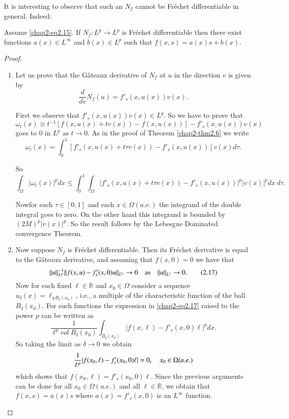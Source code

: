 It is interesting to observe that such an $N_{f}$ cannot be Fr\'echet
differentiable in general. Indeed:

\begin{theorem}\label{chap2-thm2.7}
Assume \eqref{chap2-eq2.15}. If $N_{f}:L^{p}\to L^{p}$ is Fr\'echet
differentiable then there exist functions $a(x)\in L^{\infty}$ and
$b(x)\in L^{p}$ such that $f(x,s)=a(x)s+b(x)$.
\end{theorem}

\begin{proof}
\begin{enumerate}
\renewcommand{\theenumi}{\alph{enumi}}
\renewcommand{\labelenumi}{(\theenumi)}
\item Let us prove that the G\^ateaux derivative of $N_{f}$ at $u$ in
  the direction $v$ is given by
$$
\frac{d}{dv}N_{f}(u)=f'_{s}(x,u(x))v(x).
$$

First we observe that $f'_{s}(x,u(x))v(x)\in L^{q}$. So we have to
prove that
$$
\omega_{t}(x)\equiv
t^{-1}[f(x,u(x)+tv(x))-f(x,u(x))]-f'_{s}(x,u(x))v(x)
$$
goes to $0$ in $L^{p}$ as $t\to 0$. As in the proof of Theorem
\ref{chap2-thm2.6} we write
$$
\omega_{t}(x)=\int^{1}_{0}[f'_{s}(x,u(x)+t\tau
  v(x))-f'_{s}(x,u(x))]v(x)d\tau. 
$$

So
{\fontsize{10pt}{12pt}\selectfont
$$
\int_{\Omega}|\omega_{t}(x)|^{p}dx\leq
\int^{1}_{0}\int_{\Omega}|f'_{s}(x,u(x)+t\tau
v(x))-f'_{s}(x,u(x))|^{p}|v(x)|^{p}dx\ d\tau. 
$$}

Now\pageoriginale for each $\tau\in [0,1]$ and each $x\in
\Omega(a.e.)$ the integrand of the double integral goes to zero. On
the other hand this integrand is bounded by $(2M)^{p}|v(x)|^{p}$. So
the result follows by the Lebesgue Dominated convergence Theorem.

\item Now suppose $N_{f}$ is Fr\'echet differentiable. Then its
  Fr\'echet derivative is equal to the G\^ateaux derivative, and
  assuming that $f(x,0)=0$ we have that
\begin{equation*}
||u||^{-1}_{L^{p}}||f(x,u)-f'_{s}(x,0)u||_{L^{p}}\to 0\quad\text{as}\quad
||u||_{L^{1}}\to 0.\tag{2.17}\label{chap2-eq2.17} 
\end{equation*}
Now for each fixed $\ell\in \mathbb{R}$ and $x_{0}\in \Omega$ consider
a sequence $u_{\delta}(x)=\ell_{\chi B_{\delta}(x_{0})}$, i.e., a
multiple of the characteristic function of the ball
$B_{\delta}(x_{0})$. For such functions the expression in
\eqref{chap2-eq2.17} raised to the power $p$ can be written as 
$$
\frac{1}{\ell^{p}vol\ B_{\delta}(x_{0})}\int_{B_{\delta}(x_{0})}|f(x,\ell)-f'_{s}(x,0)\ell|^{p}dx. 
$$
So taking the limit as $\delta\to 0$ we obtain
$$
\frac{1}{\ell^{p}}|f(x_{0},\ell)-f'_{s}(x_{0},0)\ell|=0,\quad x_{0}\in
\Omega(a.e.) 
$$
which shows that $f(x_{0},\ell)=f'_{s}(x_{0},0)\ell$. Since the
previous arguments can be done for all $x_{0}\in \Omega(a.e.)$ and all
$\ell\in \mathbb{R}$, we obtain that $f(x,s)=a(x)s$ where
$a(x)=f'_{s}(x,0)$ is an $L^{\infty}$ function.
\end{enumerate}
\end{proof}

